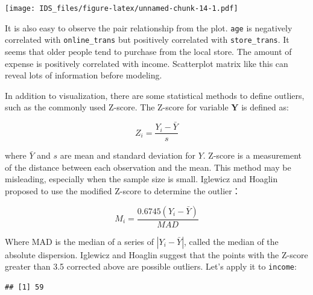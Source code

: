 \documentclass[12pt,]{krantz}
\makeatletter
\newenvironment{Shaded}{\begin{snugshade}}{\end{snugshade}}
\newcommand{\CommentTok}[1]{\textcolor[rgb]{0.37,0.37,0.37}{\textit{#1}}}
\newcommand{\FloatTok}[1]{\textcolor[rgb]{0.06,0.06,0.06}{#1}}
\newcommand{\KeywordTok}[1]{\textcolor[rgb]{0.27,0.27,0.27}{\textbf{#1}}}
\newcommand{\NormalTok}[1]{#1}
\newcommand{\OperatorTok}[1]{\textcolor[rgb]{0.43,0.43,0.43}{\textbf{#1}}}
\newcommand{\StringTok}[1]{\textcolor[rgb]{0.5,0.5,0.5}{#1}}
\newenvironment{kframe}{%
\medskip{}
\setlength{\fboxsep}{.8em}
 \def\at@end@of@kframe{}%
 \ifinner\ifhmode%
  \def\at@end@of@kframe{\end{minipage}}%
  \begin{minipage}{\columnwidth}%
 \fi\fi%
 \def\FrameCommand##1{\hskip\@totalleftmargin \hskip-\fboxsep
 \colorbox{shadecolor}{##1}\hskip-\fboxsep
     \hskip-\linewidth \hskip-\@totalleftmargin \hskip\columnwidth}%
 \MakeFramed {\advance\hsize-\width
   \@totalleftmargin\z@ \linewidth\hsize
   \@setminipage}}%
 {\par\unskip\endMakeFramed%
 \at@end@of@kframe}
\renewenvironment{Shaded}{\begin{kframe}}{\end{kframe}}
\makeatother
\begin{document}
\texttt{[image: IDS\_files/figure-latex/unnamed-chunk-14-1.pdf]}

It is also easy to observe the pair relationship from the plot. \texttt{age} is negatively correlated with \texttt{online\_trans} but positively correlated with \texttt{store\_trans}. It seems that older people tend to purchase from the local store. The amount of expense is positively correlated with income. Scatterplot matrix like this can reveal lots of information before modeling.

In addition to visualization, there are some statistical methods to define outliers, such as the commonly used Z-score. The Z-score for variable \(\mathbf{Y}\) is defined as:

\[Z_{i}=\frac{Y_{i}-\bar{Y}}{s}\]

where \(\bar{Y}\) and \(s\) are mean and standard deviation for \(Y\). Z-score is a measurement of the distance between each observation and the mean. This method may be misleading, especially when the sample size is small. Iglewicz and Hoaglin proposed to use the modified Z-score to determine the outlier\citep{mad1}：

\[M_{i}=\frac{0.6745(Y_{i}-\bar{Y})}{MAD}\]

Where MAD is the median of a series of \(|Y_ {i} - \bar{Y}|\), called the median of the absolute dispersion. Iglewicz and Hoaglin suggest that the points with the Z-score greater than 3.5 corrected above are possible outliers. Let's apply it to \texttt{income}:

\begin{Shaded}
\end{Shaded}

\begin{verbatim}
## [1] 59
\end{verbatim}
\end{document}
